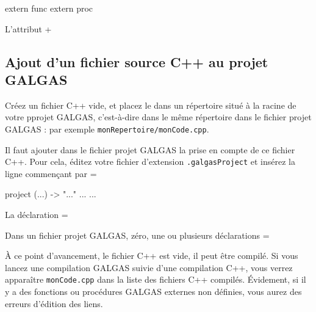 \begin{galgas}
extern func %
extern proc %
\end{galgas}

L'attribut \ggs+%






\subsection{Ajout d'un fichier source C++ au projet GALGAS}


Créez un fichier C++ vide, et placez le dans un répertoire situé à la racine de votre pprojet GALGAS, c'est-à-dire dans le même répertoire dans le fichier projet GALGAS : par exemple \texttt{monRepertoire/monCode.cpp}.

Il faut ajouter dans le fichier projet GALGAS la prise en compte de ce fichier C++. Pour cela, éditez votre fichier d'extension \texttt{.galgasProject} et insérez la ligne commençant par \ggs=%

\begin{galgas}
project (...) -> "..." {
  ...
  ...
}
\end{galgas}

La déclaration \ggs=%

Dans un fichier projet GALGAS, zéro, une ou plusieurs déclarations \ggs=%

À ce point d'avancement, le fichier C++ est vide, il peut être compilé. Si vous lancez une compilation GALGAS suivie d'une compilation C++, vous verrez apparaître \texttt{monCode.cpp} dans la liste des fichiers C++ compilés. Évidement, si il y a des fonctions ou procédures GALGAS externes non définies, vous aurez des erreurs d'édition des liens.





